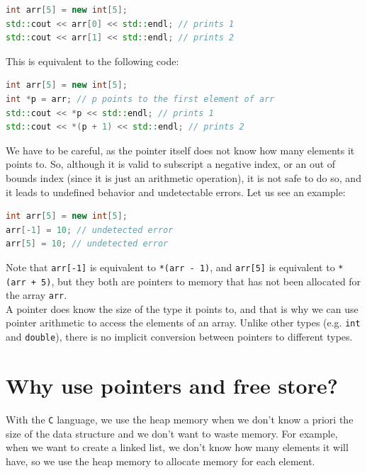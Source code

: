 \begin{lstlisting}[language=C++]
int arr[5] = new int[5];
std::cout << arr[0] << std::endl; // prints 1
std::cout << arr[1] << std::endl; // prints 2
\end{lstlisting}

This is equivalent to the following code:\\

\begin{lstlisting}[language=C++]
int arr[5] = new int[5];
int *p = arr; // p points to the first element of arr
std::cout << *p << std::endl; // prints 1
std::cout << *(p + 1) << std::endl; // prints 2
\end{lstlisting}

We have to be careful, as the pointer itself does not know how many elements it points to. So, although it is valid to
subscript a negative index, or an out of bounds index (since it is just an arithmetic operation), it is not safe to do so, and
it leads to undefined behavior and undetectable errors. Let us see an example:\\

\begin{lstlisting}[language=C++]
int arr[5] = new int[5];
arr[-1] = 10; // undetected error
arr[5] = 10; // undetected error
\end{lstlisting}

Note that \texttt{arr[-1]} is equivalent to \texttt{*(arr - 1)}, and \texttt{arr[5]} is equivalent to \texttt{*(arr + 5)}, but
they both are pointers to memory that has not been allocated for the array \texttt{arr}.\\

A pointer does know the size of the type it points to, and that is why we can use pointer arithmetic to access the elements of an array.
Unlike other types (e.g. \texttt{int} and \texttt{double}), there is no implicit conversion between pointers to different types.

\section{Why use pointers and free store?}

With the \texttt{C} language, we use the heap memory when we don't know a priori the size of the data structure and 
we don't want to waste memory. For example, when we want to create a linked list, we don't know how many elements
it will have, so we use the heap memory to allocate memory for each element.\\

